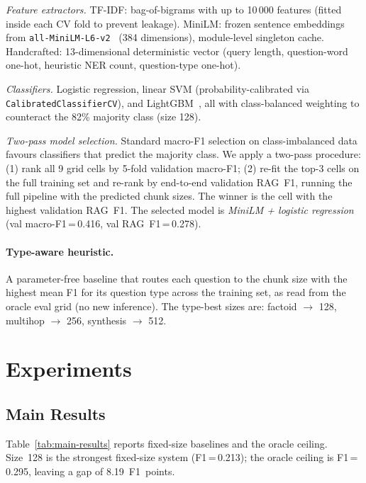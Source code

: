 \documentclass{article}
\begin{document}
\textit{Feature extractors.}
TF-IDF: bag-of-bigrams with up to 10\,000 features (fitted inside each CV
fold to prevent leakage).
MiniLM: frozen sentence embeddings from \texttt{all-MiniLM-L6-v2}~\cite{reimers2019sbert}
(384 dimensions), module-level singleton cache.
Handcrafted: 13-dimensional deterministic vector (query length, question-word
one-hot, heuristic NER count, question-type one-hot).

\textit{Classifiers.}
Logistic regression, linear SVM (probability-calibrated via
\texttt{CalibratedClassifierCV}), and LightGBM~\cite{ke2017lightgbm}, all
with class-balanced weighting to counteract the 82\% majority class (size 128).

\textit{Two-pass model selection.}
Standard macro-F1 selection on class-imbalanced data favours classifiers
that predict the majority class. We apply a two-pass procedure: (1) rank all
9 grid cells by 5-fold validation macro-F1; (2) re-fit the top-3 cells on
the full training set and re-rank by end-to-end validation RAG~F1, running
the full pipeline with the predicted chunk sizes. The winner is the cell with
the highest validation RAG~F1. The selected model is
\textit{MiniLM + logistic regression}
(val macro-F1\,=\,0.416, val RAG~F1\,=\,0.278).

\paragraph{Type-aware heuristic.}
A parameter-free baseline that routes each question to the chunk size with
the highest mean F1 for its question type across the training set, as read
from the oracle eval grid (no new inference). The type-best sizes are:
factoid $\to$ 128, multihop $\to$ 256, synthesis $\to$ 512.

\section{Experiments}

\subsection{Main Results}

Table~\ref{tab:main-results} reports fixed-size baselines and the oracle
ceiling. Size~128 is the strongest fixed-size system (F1\,=\,0.213); the
oracle ceiling is F1\,=\,0.295, leaving a gap of 8.19~F1~points.


\end{document}
